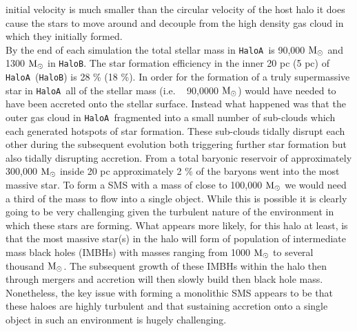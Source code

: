 \documentclass[graphics, twocolumn, usenatbib]{mn2e}
\newcommand{\msolar} {$\rm{M_{\odot}}~$}
\newcommand{\msolarc} {$\rm{M_{\odot}}$}
\newcommand{\ha} {\texttt{HaloA~}}
\newcommand{\hbc} {\texttt{HaloB}}
\begin{document}
initial velocity is much smaller than the circular
velocity of the host halo it does cause the stars to move around and decouple from the high density gas cloud in which they initially formed. \\
\indent By the end of each simulation the total stellar mass in \ha is 90,000 \msolar and 1300
\msolar in \hbc. The star formation efficiency in the inner 20 pc (5 pc) of \ha (\hbc) is 28 \%
(18 \%).  In order for the formation of a truly supermassive star in \ha all of the stellar mass
(i.e. ~ 90,0000 \msolarc) would have needed to have been accreted onto the stellar surface. Instead
what happened was that the outer gas cloud in \ha fragmented into a small number of sub-clouds which
each generated hotspots of star formation. These sub-clouds tidally disrupt each other during the
subsequent evolution both triggering further star formation but also tidally disrupting accretion.
From a total baryonic reservoir of approximately 300,000 \msolar inside 20 pc approximately 2 \% of the baryons went into the most massive star. To form a SMS
with a mass of close to 100,000 \msolar we would need a third of the mass to 
flow into a single object. While this is possible it is clearly going to be 
very challenging given the turbulent nature of the environment in which these stars are forming. What appears more likely, for this halo at least, is that the 
most massive star(s) in the halo will form of population of intermediate mass black holes (IMBHs) with masses ranging from 1000 \msolar to several thousand \msolarc. The subsequent growth of these IMBHs within the halo then through 
mergers and accretion will then slowly build then black hole mass. 
Nonetheless, the key issue with forming a monolithic SMS appears to be that
these haloes are highly turbulent and that sustaining accretion onto a single object in such an environment is hugely challenging. 
\end{document}
